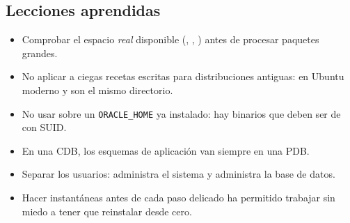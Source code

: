 \subsection*{Lecciones aprendidas}

\begin{itemize}
  \item Comprobar el espacio \emph{real} disponible (, ,
        ) antes de procesar paquetes grandes.
  \item No aplicar a ciegas recetas escritas para distribuciones antiguas: en
        Ubuntu moderno  y  son el mismo directorio.
  \item No usar  sobre un \texttt{ORACLE\_HOME} ya instalado: hay
        binarios que deben ser de  con SUID.
  \item En una CDB, los esquemas de aplicación van siempre en una PDB.
  \item Separar los usuarios:  administra el sistema y 
        administra la base de datos.
  \item Hacer instantáneas antes de cada paso delicado ha permitido trabajar sin
        miedo a tener que reinstalar desde cero.
\end{itemize}
